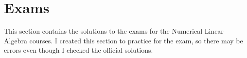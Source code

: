 \section{Exams}

This section contains the solutions to the exams for the Numerical Linear Algebra courses. I created this section to practice for the exam, so there may be errors even though I checked the official solutions.